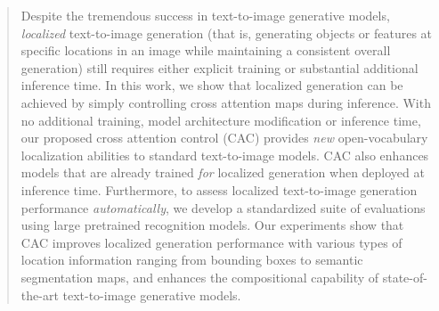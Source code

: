 \begin{abstract}
Despite the tremendous success in text-to-image generative models, \emph{localized} text-to-image generation (that is, generating objects or features at specific locations in an image while maintaining a consistent overall generation) still requires either explicit training or substantial additional inference time. In this work, we show that localized generation can be achieved by simply controlling cross attention maps during inference. With no additional training, model architecture modification or inference time, our proposed cross attention control (CAC) provides \emph{new} open-vocabulary localization abilities to standard text-to-image models. CAC also enhances models that are already trained \emph{for} localized generation when deployed at inference time.
Furthermore, to assess localized text-to-image generation performance \emph{automatically}, we develop a standardized suite of evaluations using large pretrained recognition models. Our experiments show that CAC improves localized generation performance with various types of location information ranging from bounding boxes to semantic segmentation maps, and enhances the compositional capability of state-of-the-art text-to-image generative models.













\end{abstract}